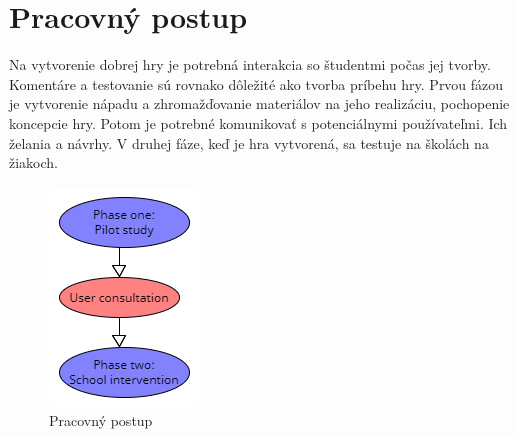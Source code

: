 \documentclass[10pt,twoside,slovak,a4paper]{article}
\begin{document}
\section{Pracovný postup}
\qquad Na vytvorenie dobrej hry je potrebná interakcia so študentmi počas jej tvorby. Komentáre a testovanie sú rovnako dôležité ako tvorba príbehu hry. Prvou fázou je vytvorenie nápadu a zhromažďovanie materiálov na jeho realizáciu, pochopenie koncepcie hry. Potom je potrebné komunikovať s potenciálnymi používateľmi. Ich želania a návrhy. V druhej fáze, keď je hra vytvorená, sa testuje na školách na žiakoch.\\
\begin{figure}[tbh]
\centering
\includegraphics[scale=0.7]{9_diagram.png}
\caption{Pracovný postup}
\label{f:rozhod}
\end{figure}\\\\
\end{document}
